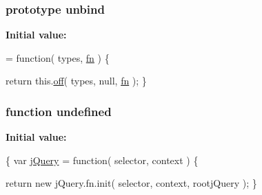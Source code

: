 \subsubsection[{unbind}]{ {\bf prototype} unbind}\label{jquery-1_810_82-vsdoc_8js_af46ad9e68add9abd540e1b4f9da37b62}
{\bfseries Initial value\+:}
\begin{DoxyCode}
= \textcolor{keyword}{function}( types, \hyperlink{jquery-1_810_82-vsdoc_8js_acef6bdaf6b9b20fdcca1ea86f0902c3b}{fn} ) \{


        \textcolor{keywordflow}{return} this.\hyperlink{jquery-1_810_82-vsdoc_8js_abd3345ae76b0b1425e11cd916e7bc97c}{off}( types, null, \hyperlink{jquery-1_810_82-vsdoc_8js_acef6bdaf6b9b20fdcca1ea86f0902c3b}{fn} );
    \}
\end{DoxyCode}
\hypertarget{jquery-1_810_82-vsdoc_8js_a08113a236cc18d2a9d5ce27e638012be}{}
\subsubsection[{undefined}]{\setlength{\rightskip}{0pt plus 5cm}function undefined}\label{jquery-1_810_82-vsdoc_8js_a08113a236cc18d2a9d5ce27e638012be}
{\bfseries Initial value\+:}
\begin{DoxyCode}
\{
var \hyperlink{jquery-1_810_82-vsdoc_8js_add5237586d970a38a81f990e8eb28c6c}{jQuery} = \textcolor{keyword}{function}( selector, context ) \{


        
        \textcolor{keywordflow}{return} \textcolor{keyword}{new} jQuery.fn.init( selector, context, rootjQuery );
    \}
\end{DoxyCode}
\hypertarget{jquery-1_810_82-vsdoc_8js_adf3212944c5742602d54b599a05f0746}{}
